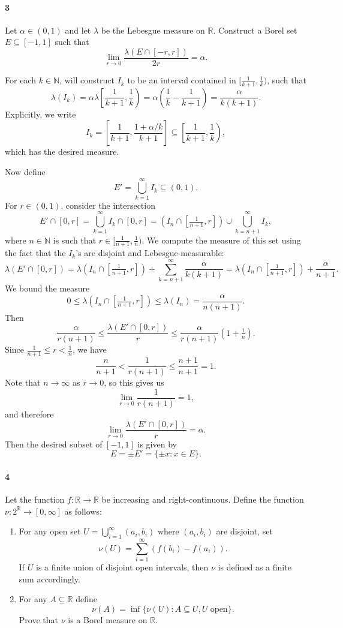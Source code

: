 \documentclass[12pt]{article}
\newlength{\myparskip}
\newenvironment{fullbox}{\begin{lrbox}{\savefullbox}\begin{minipage}{\dimexpr\textwidth-2\fboxsep\relax}\setlength{\parskip}{\myparskip}}{\end{minipage}\end{lrbox}\framebox[\textwidth]{\usebox{\savefullbox}}}
\newenvironment{pbox}[1][]{\begin{fullbox}\ifx#1\empty\else\paragraph{#1}\phantom{}\fi}{\end{fullbox}}
\theoremstyle{definition}
\newcommand{\N}{\mathbb{N}}
\newcommand{\R}{\mathbb{R}}
\newcommand{\<}{\langle}
\renewcommand{\>}{\rangle}
\newcommand{\seq}{\subseteq}
\begin{document}
\newpage
\begin{pbox}[3]
    Let $\alpha \in (0, 1)$ and let $\lambda$ be the Lebesgue measure on $\R$.
    Construct a Borel set $E \seq [-1, 1]$ such that
    \[
        \lim_{r \to 0} \frac{\lambda(E \cap [-r, r])}{2r} = \alpha.
    \]
\end{pbox}

For each $k \in \N$,  will construct $I_k$ to be an interval contained in $[\frac{1}{k+1}, \frac{1}{k})$, such that
\[\textstyle
    \lambda(I_k)
        = \alpha \lambda\left[\frac{1}{k+1}, \frac{1}{k}\right)
        = \alpha \left(\frac{1}{k} - \frac{1}{k+1}\right)
        = \frac{\alpha}{k(k+1)}.
\]
Explicitly, we write
\[\textstyle
    I_k = \left[\frac{1}{k+1}, \frac{1 + \alpha/k}{k+1}\right] \seq \left[\frac{1}{k+1}, \frac{1}{k}\right),
\]
which has the desired measure.

Now define
\[
    E' = \bigcup_{k=1}^{\infty} I_k \seq (0, 1).
\]
For $r \in (0, 1)$, consider the intersection
\[
    E' \cap [0, r]
        = \bigcup_{k=1}^{\infty} I_k \cap [0, r]
        = (I_n \cap [\tfrac{1}{n+1}, r]) \cup \bigcup_{k=n+1}^{\infty} I_k,
\]
where $n \in \N$ is such that $r \in [\frac{1}{n+1}, \frac{1}{n})$.
We compute the measure of this set using the fact that the $I_k$'s are disjoint and Lebesgue-measurable:
\[
    \lambda(E' \cap [0, r])
        = \lambda(I_n \cap [\tfrac{1}{n+1}, r]) + \sum_{k=n+1}^{\infty} \frac{\alpha}{k(k+1)}
        = \lambda(I_n \cap [\tfrac{1}{n+1}, r]) + \frac{\alpha}{n+1}.
\]
We bound the measure
\[
    0
        \leq \lambda(I_n \cap [\tfrac{1}{n+1}, r])
        \leq \lambda(I_n)
        = \frac{\alpha}{n(n + 1)}.
\]
Then 
\[
    \frac{\alpha}{r(n + 1)}
        \leq \frac{\lambda(E' \cap [0, r])}{r}
        \leq \frac{\alpha}{r(n + 1)} \left(1 + \tfrac{1}{n}\right).
\]
Since $\frac{1}{n+1} \leq r < \frac{1}{n}$, we have
\[
    \frac{n}{n+1} < \frac{1}{r(n+1)} \leq \frac{n+1}{n+1} = 1.
\]
Note that $n \to \infty$ as $r \to 0$, so this gives us
\[
    \lim_{r \to 0} \frac{1}{r(n+1)} = 1,
\]
and therefore
\[
    \lim_{r \to 0} \frac{\lambda(E' \cap [0, r])}{r} = \alpha.
\]
Then the desired subset of $[-1, 1]$ is given by
\[
    E = \pm E' = \{\pm x : x \in E\}.
\]


\newpage
\begin{pbox}[4]
    Let the function $f : \R \to \R$ be increasing and right-continuous.
    Define the function $\nu : 2^\R \to [0, \infty]$ as follows:
    \begin{enumerate}
        \item For any open set $U = \bigcup_{i=1}^{\infty} (a_i, b_i)$ where $(a_i, b_i)$ are disjoint, set
        \[
            \nu(U) = \sum_{i=1}^{\infty} (f(b_i) - f(a_i)).
        \]
        If $U$ is a finite union of disjoint open intervals, then $\nu$ is defined as a finite sum accordingly.
        \item For any $A \seq \R$ define
        \[
            \nu(A) = \inf\{\nu(U) : A \seq U, U \text{ open}\}.
        \]
        Prove that $\nu$ is a Borel measure on $\R$.
    \end{enumerate}
\end{pbox}
\end{document}
